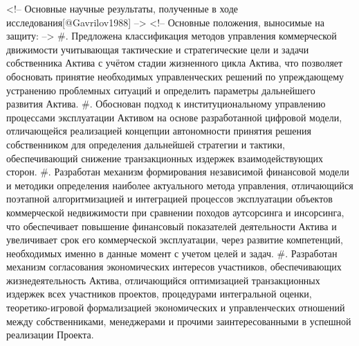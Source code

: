 <!-- Основные научные результаты, полученные в ходе исследования[@Gavrilov1988] -->
<!-- Основные положения, выносимые на защиту: -->
#. Предложена классификация методов управления коммерческой движимости учитывающая тактические и стратегические цели и задачи собственника Актива с учётом стадии жизненного цикла Актива, что позволяет обосновать принятие необходимых управленческих решений по упреждающему устранению проблемных ситуаций и определить параметры дальнейшего развития Актива.
#. Обоснован подход к институциональному управлению процессами эксплуатации Активом на основе разработанной цифровой модели, отличающейся реализацией концепции автономности принятия решения собственником для определения дальнейшей стратегии и тактики, обеспечивающий снижение транзакционных издержек взаимодействующих сторон.
#. Разработан механизм формирования независимой финансовой модели и методики определения наиболее актуального метода управления, отличающийся поэтапной алгоритмизацией и интеграцией процессов эксплуатации объектов коммерческой недвижимости при сравнении походов аутсорсинга и инсорсинга, что обеспечивает повышение финансовый показателей деятельности Актива и увеличивает срок его коммерческой эксплуатации, через развитие компетенций, необходимых именно в данные момент с учетом целей и задач.
#. Разработан механизм согласования экономических интересов участников, обеспечивающих жизнедеятельность Актива, отличающийся оптимизацией транзакционных издержек всех участников проектов,  процедурами интегральной оценки, теоретико-игровой формализацией экономических и управленческих отношений между собственниками,  менеджерами и прочими заинтересованными в успешной реализации Проекта.


